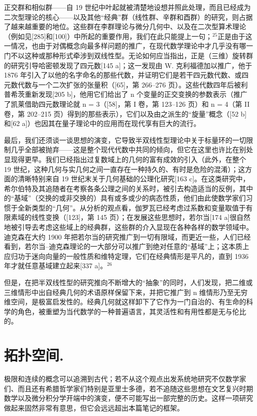 正交群和相似群——自 19 世纪中叶起就被清楚地设想并照此处理，而且已经成为二次型理论的核心——以及其他“经典”群（线性群、辛群和酉群）的研究，则占据了越来越重要的地位。这些群在李群理论与微分几何中、以及在二次型算术理论（例如见{[}285{]}和{[}100{]}）中所起的重要作用，我们在此只能提上一句；\(^{25}\)正是由于这一情况，也由于对偶概念向最多样问题的推广，在现代数学理论中才几乎没有哪一门不以这种或那种形式牵涉到双线性型。无论如何应当指出，正是（三维）旋转群的研究引导哈密顿发现了四元数{[}145 a{]}；这一发现由 W. 克利福德加以推广，他于 1876 年引入了以他的名字命名的那些代数，并证明它们是若干四元数代数、或四元数代数与一个二次扩张的张量积（{[}65{]}，第 266–276 页）。这些代数四年后被利普希茨重新发现{[}205 b{]}，他用它们给出了 n 个变量的正交变换的参数表示（推广了凯莱借助四元数理论就 n = 3（{[}58{]}，第 I 卷，第 123–126 页）和 n = 4（第 II 卷，第 202–215 页）得到的那些表示），它们以及由之派生的“旋量”概念（{[}52 b{]}和{[}62 a{]}）也因其在量子理论中的应用而在现代享有巨大的流行。

最后，我们还须谈一谈思想的演变，它导致半双线性型理论中关于标量环的一切限制几乎全部被抛弃——这是整个现代代数中共同的倾向，但它在这里也许比在别处显现得更早。我们已经指出过复数域上的几何的富有成效的引入（此外，在整个 19 世纪，这种几何与实几何之间一直存在一种持久的、有时是危险的混淆）；这方面的清晰特别来自 19 世纪末关于几何基础的公理化研究{[}163 c{]}。在这类研究中，希尔伯特及其追随者在考察各条公理之间的关系时，被引去构造适当的反例，其中的“基域”（交换的或非交换的）具有或多或少的病态性质，他们由此使数学家们习惯于全新类型的“几何”。从分析的观点看，伽罗瓦已经考虑过系数和变量取值于有限素域的线性变换（{[}123{]}，第 145 页）；在发展这些思想时，若尔当{[}174 a{]}很自然地被引导去考虑这些域上的经典群，这些群的介入显现在各种各样的数学领域中。迪克森在大约 1900 年把若尔当的研究推广到一切有限域，而更近一些，人们已经看到，若尔当–迪克森理论的一大部分可以推广到绝对任意的“基域”上；这本质上应归功于迷向向量的一般性质和维特定理，它们在经典情形是平凡的，直到 1936 年才就任意基域建立起来{[}337 a{]}。\(^{26}\)

但是，在把半双线性型的研究推向不断增大的“抽象”的同时，人们发现，把二维或三维情形中出自经典几何的术语原样保留下来，并把它推广到 n 维情形乃至无穷维空间，是极富启发性的。经典几何就这样卸下了它作为一门自治的、有生命的科学的角色，被重塑为当代数学的一种普遍语言，其灵活性和有用性都是无与伦比的。

\chapter{拓扑空间.}

极限和连续的概念可以追溯到古代；若不从这个观点出发系统地研究不仅数学家们、而且还有希腊哲学家们特别是亚里士多德，若不追随这些思想在文艺复兴时期数学以及微分积分学开端中的演变，便不可能写出一部完整的历史。这样一项研究做起来固然非常有意思，但它会远远超出本篇笔记的框架。

